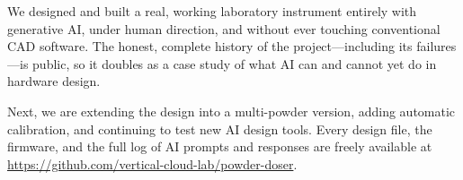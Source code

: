 \documentclass[11pt]{article}
\begin{document}
We designed and built a real, working laboratory instrument entirely with
generative AI, under human direction, and without ever touching conventional
CAD software. The honest, complete history of the project---including its
failures---is public, so it doubles as a case study of what AI can and cannot
yet do in hardware design.

Next, we are extending the design into a multi-powder version, adding
automatic calibration, and continuing to test new AI design tools. Every
design file, the firmware, and the full log of AI prompts and responses are
freely available at
\url{https://github.com/vertical-cloud-lab/powder-doser}.
\end{document}
